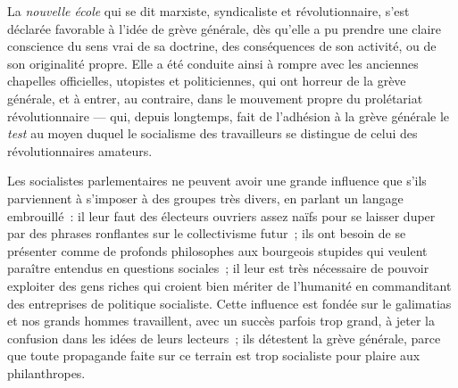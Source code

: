 \documentclass[french,twoside]{book} %
\begin{document}
La \emph{nouvelle école} qui se dit marxiste, syndicaliste et révolutionnaire, s’est déclarée favorable à l’idée de grève générale, dès qu’elle a pu prendre une claire conscience du sens vrai de sa doctrine, des conséquences de son activité, ou de son originalité propre. Elle a été conduite  ainsi à rompre avec les anciennes chapelles officielles, utopistes et politiciennes, qui ont horreur de la grève générale, et à entrer, au contraire, dans le mouvement propre du prolétariat révolutionnaire — qui, depuis longtemps, fait de l’adhésion à la grève générale le \emph{test} au moyen duquel le socialisme des travailleurs se distingue de celui des révolutionnaires amateurs.\par
Les socialistes parlementaires ne peuvent avoir une grande influence que s’ils parviennent à s’imposer à des groupes très divers, en parlant un langage embrouillé : il leur faut des électeurs ouvriers assez naïfs pour se laisser duper par des phrases ronflantes sur le collectivisme futur ; ils ont besoin de se présenter comme de profonds philosophes aux bourgeois stupides qui veulent paraître entendus en questions sociales ; il leur est très nécessaire de pouvoir exploiter des gens riches qui croient bien mériter de l’humanité en commanditant des entreprises de politique socialiste. Cette influence est fondée sur le galimatias et nos grands hommes travaillent, avec un succès parfois trop grand, à jeter la confusion dans les idées de leurs lecteurs ; ils détestent la grève générale, parce que toute propagande faite sur ce terrain est trop socialiste pour plaire aux philanthropes.\par
\end{document}
